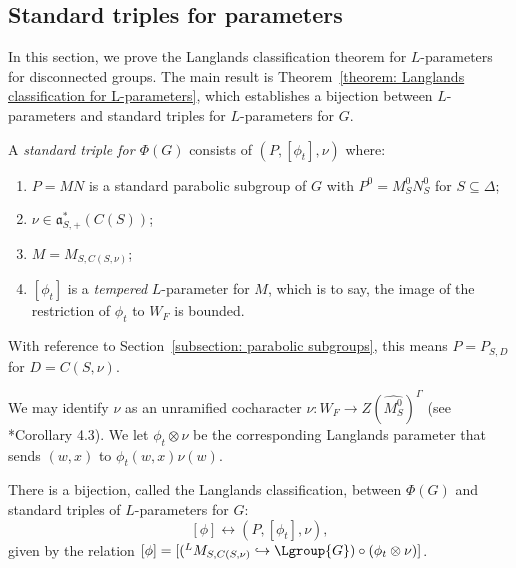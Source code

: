\documentclass[11pt,letterpaper]{amsart}
\numberwithin{equation}{section}
\begin{document}
\subsection{Standard triples for parameters}\label{subsection: standard parameters}

In this section, we prove the Langlands classification theorem for $L$-parameters for disconnected groups.
The main result is Theorem~\ref{theorem: Langlands classification for L-parameters}, which establishes a bijection between $L$-parameters and standard triples for $L$-parameters for $G$.


\begin{definition}\label{definition: standard parameters}
    A {\it standard triple for  $\Phi(G)$} consists of $(P,[\phi_t],\nu)$ where:
    \begin{enumerate}
        \item[(0)] $P=MN$ is a standard parabolic subgroup of $G$ with $P^0=M^0_{S} N_S^0$ for ${S}\subseteq \Delta$;
       \item[(1)] $\nu\in\mathfrak{a}_{{S},+}^*(C(S))$;
        \item[(2)]  $M=M_{{S},C({S},\nu)}$;
        \item[(3)]
        $[\phi_t]$ is a {\it tempered}
        $L$-parameter for $M$, which is to say, the image of the restriction of $\phi_t$ to $W_F$ is bounded. 
    \end{enumerate}
With reference to Section~\ref{subsection: parabolic subgroups}, this means $P = P_{{S},D}$ for $D = C({S},\nu)$.
\end{definition}

We may identify $\nu$ as an unramified cocharacter $\nu: W_F \to Z(\widehat{M_S^0})^{\Gamma}$ (see \cite{SZ18}*{Corollary 4.3}). We let $\phi_t \otimes \nu$ be the corresponding Langlands parameter that sends $(w,x)$ to $\phi_t(w,x)\nu(w)$. 

\begin{theorem}\label{theorem: Langlands classification for L-parameters}
    There is a bijection, called the Langlands classification, between $\Phi(G)$ and standard triples of $L$-parameters for $G$:
    \[
    [\phi]
    \leftrightarrow
    (P,[\phi_t],\nu),
    \]
given by the relation $[\phi]= [ ({}^LM_{S,C(S,\nu)} \hookrightarrow \Lgroup{G}) \circ (\phi_t \otimes \nu)]$. 
\end{theorem}
\end{document}
